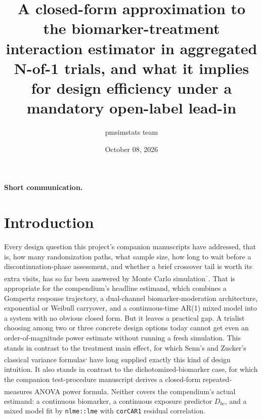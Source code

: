 \documentclass[
  11pt,
]{article}
\title{A closed-form approximation to the biomarker-treatment interaction estimator in aggregated N-of-1 trials, and what it implies for design efficiency under a mandatory open-label lead-in}
\author{pmsimstats team}
\date{October 08, 2026}
\begin{document}
\maketitle

{
\setcounter{tocdepth}{2}
\tableofcontents
}
\textbf{Short communication.}

\section{Introduction}\label{introduction}

Every design question this project's companion manuscripts have
addressed, that is, how many randomization paths, what sample
size, how long to wait before a discontinuation-phase assessment,
and whether a brief crossover tail is worth its extra visits, has
so far been answered by Monte Carlo simulation\textsuperscript{--}. That is appropriate for
the compendium's headline estimand, which combines a Gompertz
response trajectory, a dual-channel biomarker-moderation
architecture, exponential or Weibull carryover, and a continuous-time
AR(1) mixed model into a system with no obvious closed form. But
it leaves a practical gap. A trialist choosing among two or three
concrete design options today cannot get even an
order-of-magnitude power estimate without running a fresh
simulation. This stands in contrast to the treatment main
effect, for which Senn's and Zucker's classical variance formulas\textsuperscript{,} have long
supplied exactly this kind of design intuition. It also stands
in contrast to the dichotomized-biomarker case, for which the
companion test-procedure manuscript derives a closed-form
repeated-measures ANOVA power formula\textsuperscript{}.
Neither covers the
compendium's actual estimand: a continuous biomarker, a continuous
exposure predictor \(D_{bc}\), and a mixed model fit by
\texttt{nlme::lme} with \texttt{corCAR1} residual correlation.
\end{document}
